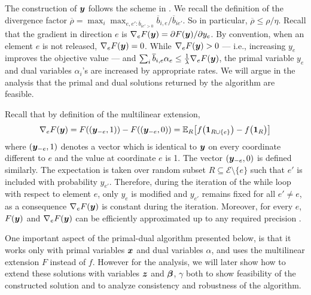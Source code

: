 The construction of $\bm{y}$ follows the scheme in \cite{Thang20:Online-Primal-Dual}. 
We recall the definition of the divergence factor $\overline{\rho} = \max_{i} \max_{e,e': \overline{b}_{ie' > 0}} \overline{b}_{i,e} / \overline{b}_{ie'}$.
So in particular, $\overline{\rho} \leq \rho/\eta$. 
Recall that the gradient in direction $e$ is $\nabla_{e} F(\bm{y}) = \partial F(\bm{y})/\partial y_{e}$.
By convention, when an element $e$ is not released, $\nabla_{e} F(\bm{y}) = 0$.  
While $\nabla_{e} F(\bm{y}) > 0$ --- i.e., increasing $y_{e}$ improves the objective value ---
and $\sum_{i} \overline{b}_{i,e}  \alpha_{e} \leq \frac{1}{\lambda} \nabla_{e} F(\bm{y})$, the primal variable $y_{e} $
and dual variables $\alpha_{i}$'s are increased by appropriate rates. We will argue in the analysis that 
the primal and dual solutions returned by the algorithm are feasible. 

Recall that by definition of the multilinear extension, 
$$
\nabla_{e} F(\bm{y})
= F((\bm{y}_{-e}, 1)) - F((\bm{y}_{-e},0))
= \mathbb{E}_{R} \bigl[ f\bigl(\bm{1}_{R \cup \{e\}}\bigr) - f\bigl(\bm{1}_{R}\bigr) \bigr]
$$
where $(\bm{y}_{-e}, 1)$ denotes a vector which is identical to $\bm{y}$ on every coordinate different to $e$ and 
the value at coordinate $e$ is 1.  The vector $(\bm{y}_{-e}, 0)$ is defined similarly. 
The expectation is taken over random subset $R \subseteq \mathcal{E} \setminus \{e\}$ such that $e'$ is included with probability $y_{e'}$.
Therefore, during the iteration of the while loop with respect to element $e$, only $y_{e} $ is modified and $y_{e'} $ remains fixed for all $e' \neq e$, 
as a consequence $\nabla_{e} F(\bm{y})$ is constant during the iteration.
Moreover,  for every $e$, $F(\bm{y})$ and $\nabla_{e} F(\bm{y})$ 
can be efficiently approximated up to any required precision \cite{Vondrak10:Polyhedral-techniques}.

One important aspect of the primal-dual algorithm presented below, is that it works only with primal variables $\bm{x}$ and dual variables $\alpha$, and uses the multilinear extension $F$ instead of $f$.  However for the analysis, we will later show how to extend these solutions with variables $\bm{z}$ and $\bm{\beta}$, $\gamma$ both to show feasibility of the constructed solution and to analyze consistency and robustness of the algorithm.  

